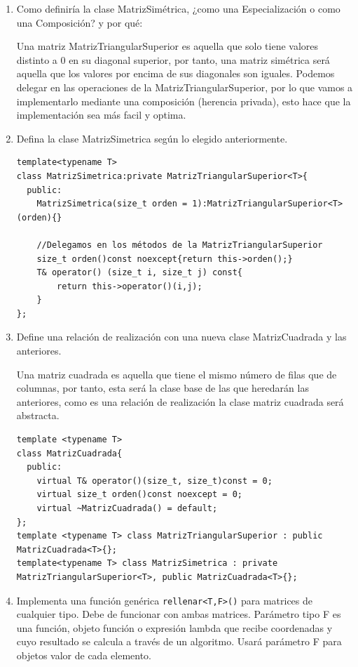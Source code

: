 \begin{enumerate}[label=\alph*)]
  \item Como definiría la clase MatrizSimétrica, ¿como una Especialización o como una Composición? y por qué:

  Una matriz MatrizTriangularSuperior es aquella que solo tiene valores distinto a 0 en su diagonal superior, por tanto, una matriz simétrica será aquella que los valores por encima de sus diagonales son iguales. Podemos delegar en las operaciones de la MatrizTriangularSuperior, por lo que vamos a implementarlo mediante una composición (herencia privada), esto hace que la implementación sea más facil y optima.

  \item Defina la clase MatrizSimetrica según lo elegido anteriormente.

\begin{verbatim}
template<typename T>
class MatrizSimetrica:private MatrizTriangularSuperior<T>{
  public:
    MatrizSimetrica(size_t orden = 1):MatrizTriangularSuperior<T>(orden){}

    //Delegamos en los métodos de la MatrizTriangularSuperior
    size_t orden()const noexcept{return this->orden();}
    T& operator() (size_t i, size_t j) const{
        return this->operator()(i,j);
    }
};

\end{verbatim}
  \item Define una relación de realización con una nueva clase MatrizCuadrada y las anteriores.
  
  Una matriz cuadrada es aquella que tiene el mismo número de filas que de columnas, por tanto, esta será la clase base de las que heredarán las anteriores, como es una relación de realización la clase matriz cuadrada será abstracta.
  
\begin{verbatim}
template <typename T>
class MatrizCuadrada{
  public:
    virtual T& operator()(size_t, size_t)const = 0;
    virtual size_t orden()const noexcept = 0;
    virtual ~MatrizCuadrada() = default;
};
template <typename T> class MatrizTriangularSuperior : public MatrizCuadrada<T>{};
template<typename T> class MatrizSimetrica : private MatrizTriangularSuperior<T>, public MatrizCuadrada<T>{};

\end{verbatim}
  \item Implementa una función genérica \texttt{rellenar<T,F>()} para matrices de cualquier tipo. Debe de funcionar con ambas matrices. Parámetro tipo F es una función, objeto función o expresión lambda que recibe coordenadas y cuyo resultado se calcula a través de un algoritmo. Usará parámetro F para objetos valor de cada elemento.
  

\end{enumerate}
